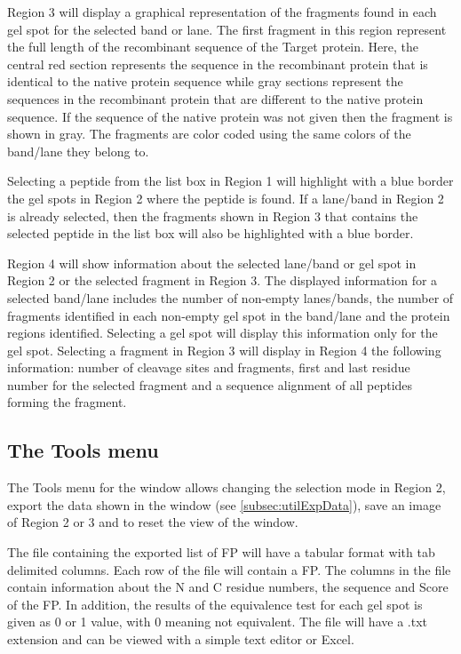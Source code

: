 Region \num{3} will display a graphical representation of the fragments found in each gel spot for the selected band or lane. The first fragment in this region represent the full length of the recombinant sequence of the Target protein. Here, the central red section represents the sequence in the recombinant protein that is identical to the native protein sequence while gray sections represent the sequences in the recombinant protein that are different to the native protein sequence.  If the sequence of the native protein was not given then the fragment is shown in gray. The fragments are color coded using the same colors of the band/lane they belong to.

Selecting a peptide from the list box in Region \num{1} will highlight with a blue border the gel spots in Region \num{2} where the peptide is found. If a lane/band in Region \num{2} is already selected, then the fragments shown in Region \num{3} that contains the selected peptide in the list box will also be highlighted with a blue border.

Region \num{4} will show information about the selected lane/band or gel spot in Region \num{2} or the selected fragment in Region \num{3}. The displayed information for a selected band/lane includes the number of non-empty lanes/bands, the number of fragments identified in each non-empty gel spot in the band/lane and the protein regions identified. Selecting a gel spot will display this information only for the gel spot. Selecting a fragment in Region \num{3} will display in Region \num{4} the following information: number of cleavage sites and fragments, first and last residue number for the selected fragment and a sequence alignment of all peptides forming the fragment.  

\subsection{The Tools menu}
\label{subsec:limprotToolsMenu}

The Tools menu for the window allows changing the selection mode in Region \num{2}, export the data shown in the window (see \autoref{subsec:utilExpData}), save an image of Region \num{2} or \num{3} and to reset the view of the window.

The file containing the exported list of FP will have a tabular format with tab delimited columns. Each row of the file will contain a FP. The columns in the file contain information about the N and C residue numbers, the sequence and Score of the FP. In addition, the results of the equivalence test for each gel spot is given as 0 or 1 value, with 0 meaning not equivalent. The file will have a .txt extension and can be viewed with a simple text editor or Excel.